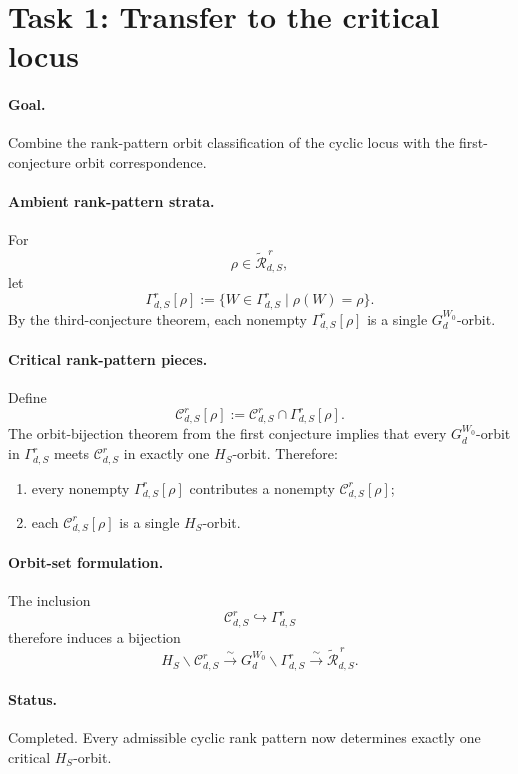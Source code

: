 \section*{Task 1: Transfer to the critical locus}

\paragraph{Goal.}
Combine the rank-pattern orbit classification of the cyclic locus with the
first-conjecture orbit correspondence.

\paragraph{Ambient rank-pattern strata.}
For
\[
\rho\in \widetilde{\mathcal R}_{d,S}^{\,r},
\]
let
\[
\Gamma_{d,S}^r[\rho]
:=
\{W\in \Gamma_{d,S}^r\mid \rho(W)=\rho\}.
\]
By the third-conjecture theorem, each nonempty
\(\Gamma_{d,S}^r[\rho]\) is a single \(G_d^{W_0}\)-orbit.

\paragraph{Critical rank-pattern pieces.}
Define
\[
\mathcal C_{d,S}^r[\rho]
:=
\mathcal C_{d,S}^r\cap \Gamma_{d,S}^r[\rho].
\]
The orbit-bijection theorem from the first conjecture implies that every
\(G_d^{W_0}\)-orbit in \(\Gamma_{d,S}^r\) meets \(\mathcal C_{d,S}^r\) in
exactly one \(H_S\)-orbit. Therefore:
\begin{enumerate}
\item every nonempty \(\Gamma_{d,S}^r[\rho]\) contributes a nonempty
  \(\mathcal C_{d,S}^r[\rho]\);
\item each \(\mathcal C_{d,S}^r[\rho]\) is a single \(H_S\)-orbit.
\end{enumerate}

\paragraph{Orbit-set formulation.}
The inclusion
\[
\mathcal C_{d,S}^r\hookrightarrow \Gamma_{d,S}^r
\]
therefore induces a bijection
\[
H_S\backslash \mathcal C_{d,S}^r
\xrightarrow{\sim}
G_d^{W_0}\backslash \Gamma_{d,S}^r
\xrightarrow{\sim}
\widetilde{\mathcal R}_{d,S}^{\,r}.
\]

\paragraph{Status.}
Completed. Every admissible cyclic rank pattern now determines exactly one
critical \(H_S\)-orbit.
